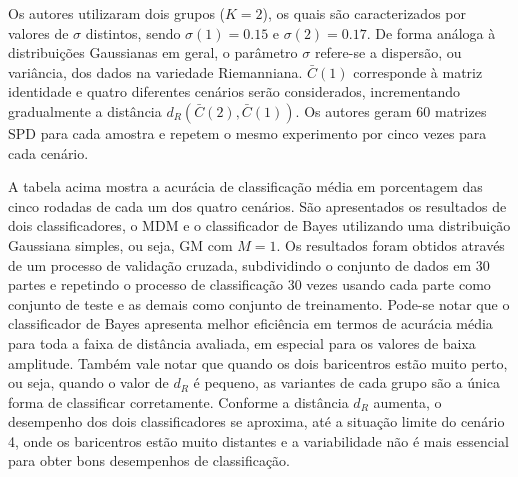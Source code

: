 \documentclass[a4paper,titlepage]{article}
\begin{document}
Os autores utilizaram dois grupos ($K=2$), os quais são caracterizados por
valores de $\sigma$ distintos, sendo $\sigma(1) = 0.15$ e $\sigma(2) = 0.17$.
De forma análoga à distribuições Gaussianas em geral, o parâmetro $\sigma$
refere-se a dispersão, ou variância, dos dados na variedade Riemanniana.  
$\bar{C}(1)$ corresponde à matriz identidade e quatro diferentes cenários serão
considerados, incrementando gradualmente a distância
$d_R(\bar{C}(2), \bar{C}(1))$. Os autores geram 60 matrizes SPD para cada
amostra e repetem o mesmo experimento por cinco vezes para cada cenário.

\begin{center}
  \vspace{1em}
  \vspace{1em}
\end{center}

A tabela acima mostra a acurácia de classificação média em porcentagem das
cinco rodadas de cada um dos quatro cenários. São apresentados os resultados
de dois classificadores, o MDM e o classificador de Bayes utilizando uma
distribuição Gaussiana simples, ou seja, GM com $M=1$. Os resultados foram
obtidos através de um processo de validação cruzada, subdividindo o conjunto de
dados em 30 partes e repetindo o processo de classificação 30 vezes usando cada
parte como conjunto de teste e as demais como conjunto de treinamento.
Pode-se notar que o classificador de Bayes apresenta melhor eficiência em
termos de acurácia média para toda a faixa de distância avaliada, em especial
para os valores de baixa amplitude. Também vale notar que quando os dois
baricentros estão muito perto, ou seja, quando o valor de $d_R$ é pequeno,
as variantes de cada grupo são a única forma de classificar corretamente.
Conforme a distância $d_R$ aumenta, o desempenho dos dois classificadores se
aproxima, até a situação limite do cenário 4, onde os baricentros estão muito
distantes e a variabilidade não é mais essencial para obter bons desempenhos de
classificação.
\end{document}
